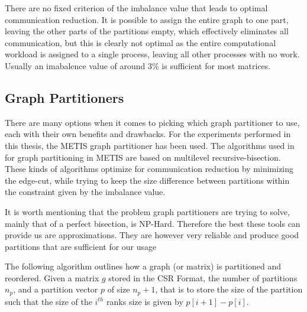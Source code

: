 There are no fixed criterion of the imbalance value that leads to optimal communication reduction. It is possible to assign the entire graph to one part, leaving the other parts of the partitions empty, which effectively eliminates all communication, but this is clearly not optimal as the entire computational workload is assigned to a single process, leaving all other processes with no work. Usually an imabalence value of around 3\% is sufficient for most matrices.
\medskip


\subsection{Graph Partitioners}
There are many options when it comes to picking which graph partitioner to use, each with their own benefits and drawbacks. For the experiments performed in this thesis, the METIS graph partitioner has been used. The algorithms used in for graph partitioning in METIS are based on multilevel recursive-bisection. These kinds of algorithms optimize for communication reduction by minimizing the edge-cut, while trying to keep the size difference between partitions within the constraint given by the imbalance value.
\medskip

It is worth mentioning that the problem graph partitioners are trying to solve, mainly that of a perfect bisection, is NP-Hard. Therefore the best these tools can provide us are approximations. They are however very reliable and produce good partitions that are sufficient for our usage
\medskip


The following algorithm outlines how a graph (or matrix) is partitioned and reordered. Given a matrix \(g\) stored in the CSR Format, the number of partitions \(n_{p}\), and a partition vector \(p\) of size \(n_{p} + 1\), that is to store the size of the partition such that the size of the \(i^{th}\) ranks size is given by \(p[i+1] - p[i]\).
\medskip

